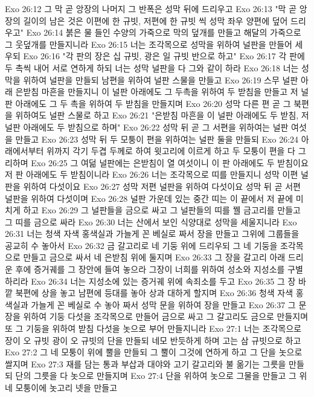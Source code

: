Exo 26:12  그 막 곧 앙장의 나머지 그 반폭은 성막 뒤에 드리우고
Exo 26:13  "막 곧 앙장의 길이의 남은 것은 이편에 한 규빗, 저편에 한 규빗 씩 성막 좌우 양편에 덮어 드리우고"
Exo 26:14  붉은 물 들인 수양의 가죽으로 막의 덮개를 만들고 해달의 가죽으로 그 웃덮개를 만들지니라
Exo 26:15  너는 조각목으로 성막을 위하여 널판을 만들어 세우되
Exo 26:16  "각 판의 장은 십 규빗, 광은 일 규빗 반으로 하고"
Exo 26:17  각 판에 두 촉씩 내어 서로 연하게 하되 너는 성막 널판을 다 그와 같이 하라
Exo 26:18  너는 성막을 위하여 널판을 만들되 남편을 위하여 널판 스물을 만들고
Exo 26:19  스무 널판 아래 은받침 마흔을 만들지니 이 널판 아래에도 그 두촉을 위하여 두 받침을 만들고 저 널판 아래에도 그 두 촉을 위하여 두 받침을 만들지며
Exo 26:20  성막 다른 편 곧 그 북편을 위하여도 널판 스물로 하고
Exo 26:21  "은받침 마흔을 이 널판 아래에도 두 받침, 저 널판 아래에도 두 받침으로 하며"
Exo 26:22  성막 뒤 곧 그 서편을 위하여는 널판 여섯을 만들고
Exo 26:23  성막 뒤 두 모퉁이 편을 위하여는 널판 둘을 만들되
Exo 26:24  아래에서부터 위까지 각기 두겹 두께로 하여 윗고리에 이르게 하고 두 모퉁이 편을 다 그리하며
Exo 26:25  그 여덞 널판에는 은받침이 열 여섯이니 이 판 아래에도 두 받침이요 저 판 아래에도 두 받침이니라
Exo 26:26  너는 조각목으로 띠를 만들지니 성막 이편 널판을 위하여 다섯이요
Exo 26:27  성막 저편 널판을 위하여 다섯이요 성막 뒤 곧 서편 널판을 위하여 다섯이며
Exo 26:28  널판 가운데 있는 중간 띠는 이 끝에서 저 끝에 미치게 하고
Exo 26:29  그 널판들을 금으로 싸고 그 널판들의 띠를 꿸 금고리를 만들고 그 띠를 금으로 싸라
Exo 26:30  너는 산에서 보인 식양대로 성막을 세울지니라
Exo 26:31  너는 청색 자색 홍색실과 가늘게 꼰 베실로 짜서 장을 만들고 그위에 그룹들을 공교히 수 놓아서
Exo 26:32  금 갈고리로 네 기둥 위에 드리우되 그 네 기둥을 조각목으로 만들고 금으로 싸서 네 은받침 위에 둘지며
Exo 26:33  그 장을 갈고리 아래 드리운 후에 증거궤를 그 장안에 들여 놓으라 그장이 너희를 위하여 성소와 지성소를 구별하리라
Exo 26:34  너는 지성소에 있는 증거궤 위에 속죄소를 두고
Exo 26:35  그 장 바깥 북편에 상을 놓고 남편에 등대를 놓아 상과 대하게 할지며
Exo 26:36  청색 자색 홍색실과 가늘게 꼰 베실로 수 놓아 짜서 성막 문을 위하여 장을 만들고
Exo 26:37  그 문장을 위하여 기둥 다섯을 조각목으로 만들어 금으로 싸고 그 갈고리도 금으로 만들지며 또 그 기둥을 위하여 받침 다섯을 놋으로 부어 만들지니라
Exo 27:1  너는 조각목으로 장이 오 규빗 광이 오 규빗의 단을 만들되 네모 반듯하게 하며 고는 삼 규빗으로 하고
Exo 27:2  그 네 모퉁이 위에 뿔을 만들되 그 뿔이 그것에 연하게 하고 그 단을 놋으로 쌀지며
Exo 27:3  재를 담는 통과 부삽과 대야와 고기 갈고리와 불 옮기는 그릇을 만들되 단의 그릇을 다 놋으로 만들지며
Exo 27:4  단을 위하여 놋으로 그물을 만들고 그 위 네 모퉁이에 놋고리 넷을 만들고

